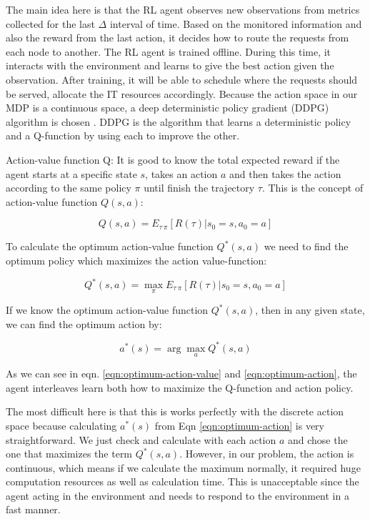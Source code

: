 \documentclass[conference]{IEEEtran}
\begin{document}
The main idea here is that the RL agent observes new observations from metrics collected for the last $\Delta$ interval of time. Based on the monitored information and also the reward from the last action, it decides how to route the requests from each node to another. The RL agent is trained offline. During this time, it interacts with the environment and learns to give the best action given the observation. After training, it will be able to schedule where the requests should be served, allocate the IT resources accordingly. Because the action space in our MDP is a continuous space, a deep deterministic policy gradient (DDPG) algorithm is chosen \cite{Lillicrap2016}. DDPG is the algorithm that learns a deterministic policy and a Q-function by using each to improve the other. 

Action-value function Q:
It is good to know the total expected reward if the agent starts at a specific state $s$, takes an action $a$ and then takes the action according to the same policy $\pi$ until finish the trajectory $\tau$. This is the concept of action-value function $Q(s,a)$:

\begin{equation}
    \label{eqn:action-value}
    Q(s,a) = E_{\tau ~ \pi} [R(\tau) | s_0 = s, a_0 = a]
\end{equation}

To calculate the optimum action-value function $Q^*(s, a)$ we need to find the optimum policy which maximizes the action value-function: 

\begin{equation}
    \label{eqn:optimum-action-value}
    Q^*(s,a) = \max_{\pi} E_{\tau ~ \pi} [R(\tau) | s_0 = s, a_0 = a]
\end{equation}

If we know the optimum action-value function $Q^*(s, a)$, then in any given state, we can find the optimum action by: 

\begin{equation}
    \label{eqn:optimum-action}
    a^*(s) = \arg\max_{a} Q^*(s,a)
\end{equation}

As we can see in eqn. \ref{eqn:optimum-action-value} and \ref{eqn:optimum-action}, the agent interleaves learn both how to maximize the Q-function and action policy. 

The most difficult here is that this is works perfectly with the discrete action space because calculating $a^*(s)$ from Eqn \ref{eqn:optimum-action} is very straightforward. We just check and calculate with each action $a$ and chose the one that maximizes the term $Q^*(s, a)$. However, in our problem, the action is continuous, which means if we calculate the maximum normally, it required huge computation resources as well as calculation time. This is unacceptable since the agent acting in the environment and needs to respond to the environment in a fast manner. 
\end{document}

